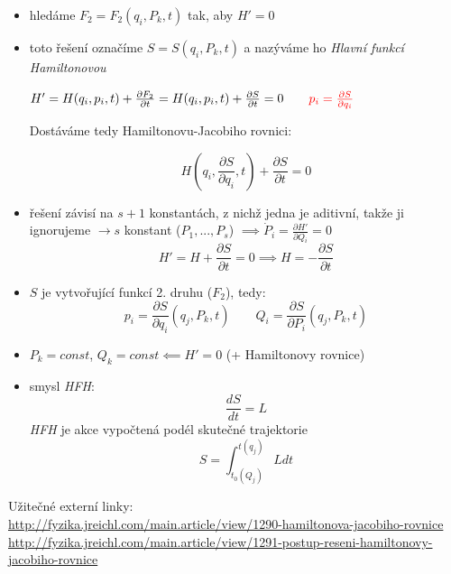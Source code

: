 \documentclass[a5paper,12pt]{article}
\begin{document}
\begin{itemize}[leftmargin=*]

\item hledáme $F_2 = F_2(q_i, P_k, t)$ tak, aby $H' = 0$
\item toto řešení označíme $S = S(q_i, P_k, t)$ a nazýváme ho \textit{Hlavní funkcí Hamiltonovou}

$H' = H(q_i, p_i, t) + \frac{\partial F_2}{\partial t} = H(q_i, p_i, t) + \frac{\partial S}{\partial t} = 0 \qquad {\color{red} p_i = \frac{\partial S}{\partial q_i}}$

Dostáváme tedy Hamiltonovu-Jacobiho rovnici:

\begin{equation*}
\boxed{
	H(q_i, {\frac{\partial S}{\partial q_i}}, t) + \frac{\partial S}{\partial t} = 0
}
\end{equation*}

\item řešení závisí na $s+1$ konstantách, z nichž jedna je aditivní, takže ji ignorujeme $\rightarrow s$ konstant ($P_1,...,P_s$) $\implies \dot{P}_i = \frac{\partial H'}{\partial Q_i} = 0$\\

\begin{equation*}
H' = H + \frac{\partial S}{\partial t} = 0 \implies H = -\frac{\partial S}{\partial t}
\end{equation*}

\item $S$ je vytvořující funkcí 2. druhu ($F_2$), tedy:
\begin{equation*}
p_i = \frac{\partial S}{\partial q_i}(q_j, P_k, t) \qquad
Q_i = \frac{\partial S}{\partial P_i}(q_j, P_k, t) 
\end{equation*}

\item $P_k = const$, $Q_k = const \impliedby H' = 0$ (+ Hamiltonovy rovnice)

\item smysl \textit{HFH}: 
\begin{equation*}
\frac{d S}{d t} = L 
\end{equation*}
\textit{HFH} je akce vypočtená podél skutečné trajektorie
\begin{equation*}
S = \int_{t_0(Q_j)}^{t(q_j)} L dt
\end{equation*}

\end{itemize}
Užitečné externí linky:\\
\url{http://fyzika.jreichl.com/main.article/view/1290-hamiltonova-jacobiho-rovnice} \\
\url{http://fyzika.jreichl.com/main.article/view/1291-postup-reseni-hamiltonovy-jacobiho-rovnice}
\end{document}

